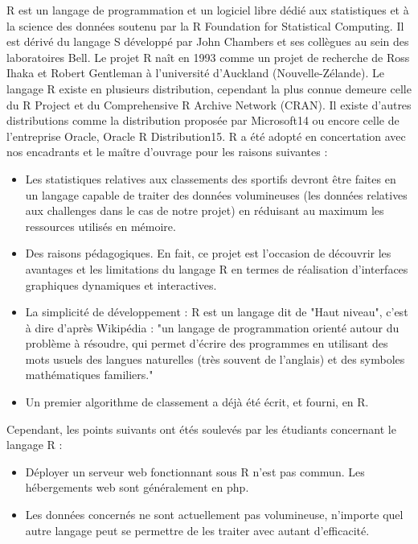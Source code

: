 R est un langage de programmation et un logiciel libre dédié aux statistiques et à la science des données soutenu par la R Foundation for Statistical Computing. Il est dérivé du langage S développé par John Chambers et ses collègues au sein des laboratoires Bell.
Le projet R naît en 1993 comme un projet de recherche de Ross Ihaka et Robert Gentleman à l'université d'Auckland (Nouvelle-Zélande). 
Le langage R existe en plusieurs distribution, cependant la plus connue demeure celle du R Project et du Comprehensive R Archive Network (CRAN). Il existe d'autres distributions comme la distribution proposée par Microsoft14 ou encore celle de l'entreprise Oracle, Oracle R Distribution15.
R a été adopté en concertation avec nos encadrants et le maître d’ouvrage pour les raisons suivantes :
\begin{itemize} 
\item Les statistiques relatives aux classements des sportifs  devront être  faites en un langage capable de traiter des données volumineuses (les données relatives aux challenges dans le cas de notre projet) en réduisant au maximum les ressources utilisés en mémoire.
\item Des raisons pédagogiques. En fait, ce projet est l’occasion de découvrir les avantages et les limitations du langage R en termes de réalisation d’interfaces graphiques dynamiques et interactives.
\item La simplicité de développement : R est un langage dit de "Haut niveau", c'est à dire d'après Wikipédia : "un langage de programmation orienté autour du problème à résoudre, qui permet d'écrire des programmes en utilisant des mots usuels des langues naturelles (très souvent de l'anglais) et des symboles mathématiques familiers."
\item Un premier algorithme de classement a déjà été écrit, et fourni, en R.
\end{itemize}
Cependant, les points suivants ont étés soulevés par les étudiants concernant le langage R :

\begin{itemize} 
	\item Déployer un serveur web fonctionnant sous R n'est pas commun. Les hébergements web sont généralement en php.
	\item Les données concernés ne sont actuellement pas volumineuse, n'importe quel autre langage peut se permettre de les traiter avec autant d'efficacité.
\end{itemize}
\newpage
